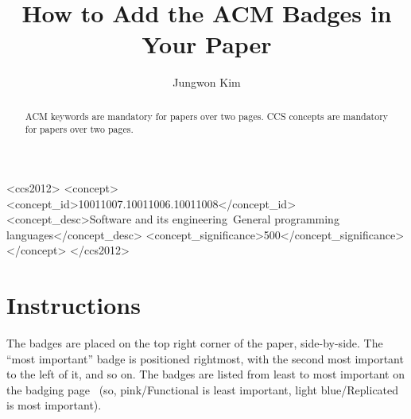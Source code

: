 \documentclass[sigplan]{acmart}
\begin{document}
\title{How to Add the ACM Badges in Your Paper}

\author{Jungwon Kim}

\begin{abstract}
ACM keywords are mandatory for papers over two pages.
CCS concepts are mandatory for papers over two pages.
\end{abstract}

\begin{CCSXML}
<ccs2012>
<concept>
<concept_id>10011007.10011006.10011008</concept_id>
<concept_desc>Software and its engineering~General programming languages</concept_desc>
<concept_significance>500</concept_significance>
</concept>
</ccs2012>
\end{CCSXML}



\maketitle


\section{Instructions}
The badges are placed on the top right corner of the paper, side-by-side. The “most important” badge is positioned rightmost, with the second most important to the left of it, and so on. The badges are listed from least to most important on the badging page~\cite{ACM} (so, pink/Functional is least important, light blue/Replicated is most important).



\end{document}
